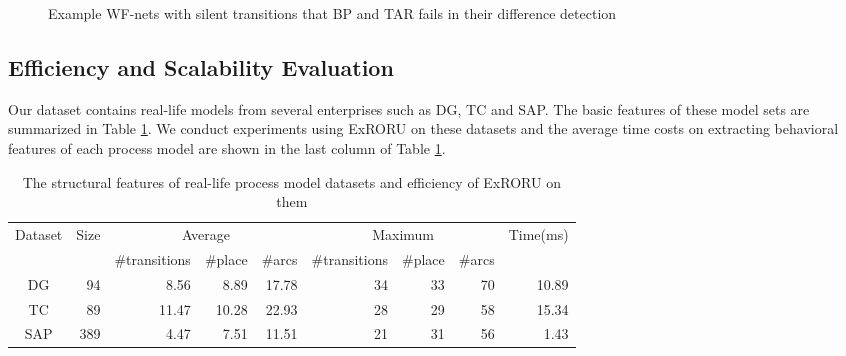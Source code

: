 \documentclass{llncs}
\begin{document}
\begin{figure}[htbp]
{\begin{minipage}[b]{0.27\textwidth}
	\end{minipage}
	\label{fig:silentExampleC}
}
\caption{Example WF-nets with silent transitions that BP and TAR fails in their difference detection\label{fig:silentExamples}}
\end{figure}

\subsection{Efficiency and Scalability Evaluation}\label{subsec:evaluation}
Our dataset contains real-life models from several enterprises such as DG, TC and SAP. The basic features of these model sets are summarized in Table \ref{tab:datasets}. We conduct experiments using ExRORU on these datasets and the average time costs on extracting behavioral features of each process model are shown in the last column of Table \ref{tab:datasets}.
\\
\begin{table}[htbp]
\centering
\caption{The structural features of real-life process model datasets and efficiency of ExRORU on them\label{tab:datasets}}
\scriptsize
\begin{tabular}{|c|r|r|r|r|r|r|r|r|} \hline
	\multicolumn{1}{|c|}{\multirow{2}{*}{Dataset}} & \multicolumn{1}{c|}{\multirow{2}{*}{Size}} & \multicolumn{3}{c|}{Average} & \multicolumn{3}{c|}{Maximum} & \multicolumn{1}{c|}{\multirow{2}{*}{Time(ms)}}\\ \cline{3-8}
	\multicolumn{1}{|c|}{} & \multicolumn{1}{c|}{} & \multicolumn{1}{c|}{\#transitions} & \multicolumn{1}{c|}{\#place} & \multicolumn{1}{c|}{\#arcs} & \multicolumn{1}{c|}{\#transitions} & \multicolumn{1}{c|}{\#place} & \multicolumn{1}{c|}{\#arcs} & \multicolumn{1}{c|}{}\\ \hline
	DG & 94 & 8.56 & 8.89 & 17.78 & 34 & 33 & 70 & 10.89 \\ \hline
	TC & 89 & 11.47 & 10.28 & 22.93 & 28 & 29 & 58 & 15.34 \\ \hline
	SAP & 389 & 4.47 & 7.51 & 11.51 & 21 & 31 & 56 & 1.43 \\ \hline
\end{tabular}
\end{table}
\end{document}
